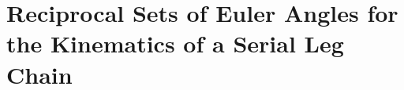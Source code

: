\documentclass[robotics,article,submit,moreauthors,pdftex]{Definitions/mdpi}
\begin{document}
\section{Reciprocal Sets of Euler Angles for the Kinematics of a Serial Leg Chain}
\label{sec:REW_seriell}

\end{document}
